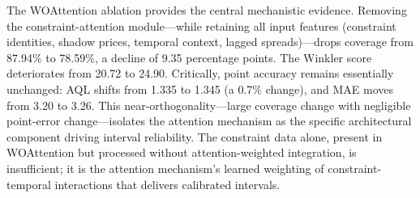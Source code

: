 \documentclass[twoside]{article}
\begin{document}
\begin{table}[t]
\caption{Ablation study (six variants).}
\label{tab:3}
\centering
{}
\end{table}
The WOAttention ablation provides the central mechanistic evidence. Removing the constraint-attention module---while retaining all input features (constraint identities, shadow prices, temporal context, lagged spreads)---drops coverage from 87.94\% to 78.59\%, a decline of 9.35 percentage points. The Winkler score deteriorates from 20.72 to 24.90. Critically, point accuracy remains essentially unchanged: AQL shifts from 1.335 to 1.345 (a 0.7\% change), and MAE moves from 3.20 to 3.26. This near-orthogonality---large coverage change with negligible point-error change---isolates the attention mechanism as the specific architectural component driving interval reliability. The constraint data alone, present in WOAttention but processed without attention-weighted integration, is insufficient; it is the attention mechanism's learned weighting of constraint-temporal interactions that delivers calibrated intervals.
\end{document}
